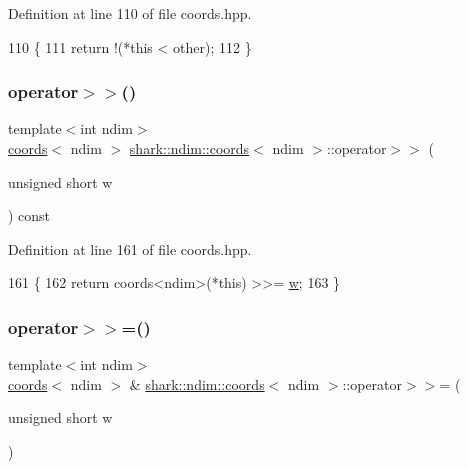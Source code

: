 Definition at line 110 of file coords.\+hpp.


\begin{DoxyCode}
110                                                                             \{
111             \textcolor{keywordflow}{return} !(*\textcolor{keyword}{this} < other);
112         \}
\end{DoxyCode}
\hypertarget{structshark_1_1ndim_1_1coords_a21e2bd4dc4a2a3c3e6601e485e6959c0}{}\label{structshark_1_1ndim_1_1coords_a21e2bd4dc4a2a3c3e6601e485e6959c0} 
\subsubsection{\texorpdfstring{operator$>$$>$()}{operator>>()}}
{\footnotesize\ttfamily template$<$int ndim$>$ \\
\hyperlink{structshark_1_1ndim_1_1coords}{coords}$<$ ndim $>$ \hyperlink{structshark_1_1ndim_1_1coords}{shark\+::ndim\+::coords}$<$ ndim $>$\+::operator$>$$>$ (\begin{DoxyParamCaption}\item[{unsigned short}]{w }\end{DoxyParamCaption}) const\hspace{0.3cm}{\ttfamily [inline]}}



Definition at line 161 of file coords.\+hpp.


\begin{DoxyCode}
161                                                                            \{
162             \textcolor{keywordflow}{return} coords<ndim>(*this) >>= \hyperlink{classshark_1_1_group_af542c8e71a81c12d6a73203ef9152d1f}{w};
163         \}
\end{DoxyCode}
\hypertarget{structshark_1_1ndim_1_1coords_a6e6f6d900230a674e60e7250d8dd259f}{}\label{structshark_1_1ndim_1_1coords_a6e6f6d900230a674e60e7250d8dd259f} 
\subsubsection{\texorpdfstring{operator$>$$>$=()}{operator>>=()}}
{\footnotesize\ttfamily template$<$int ndim$>$ \\
\hyperlink{structshark_1_1ndim_1_1coords}{coords}$<$ ndim $>$ \& \hyperlink{structshark_1_1ndim_1_1coords}{shark\+::ndim\+::coords}$<$ ndim $>$\+::operator$>$$>$= (\begin{DoxyParamCaption}\item[{unsigned short}]{w }\end{DoxyParamCaption})\hspace{0.3cm}{\ttfamily [inline]}}



